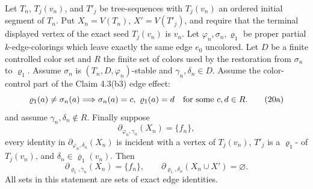 \begin{lemma}
Let \(T_n\), \(T_j(v_n)\), and \(T'_j\) be tree-sequences with
\(T_j(v_n)\) an ordered initial segment of \(T_n\).  Put
\(X_n=V(T_n)\), \(X'=V(T'_j)\), and require that the terminal displayed
vertex of the exact seed \(T_j(v_n)\) is \(v_n\).
Let \(\varphi_n,\sigma_n,\varrho_1\) be proper partial \(k\)-edge-colorings
which leave exactly the same edge \(e_0\) uncolored.  Let \(D\) be a
finite controlled color set and \(R\) the finite set of colors used by
the restoration from \(\sigma_n\) to \(\varrho_1\).  Assume
\(\sigma_n\) is \((T_n,D,\varphi_n)\)-stable and
\(\gamma_n,\delta_n\in D\).  Assume the color-control part of the
Claim 4.3(b3) edge effect:
\[
 \varrho_1(a)\ne\sigma_n(a)
 \Longrightarrow
 \sigma_n(a)=c,\ \varrho_1(a)=d\quad\hbox{for some }c,d\in R.       \tag{20a}
\]
and assume \(\gamma_n,\delta_n\notin R\).  Finally suppose
\[
 \partial_{\varphi_n,\gamma_n}(X_n)=\{f_n\},                     \tag{20b}
\]
every identity in \(\partial_{\varphi_n,\delta_n}(X_n)\) is incident
with a vertex of \(T_j(v_n)\), \(T'_j\) is a
\(\varrho_1\)- of \(T_j(v_n)\), and
\(\delta_n\in\overline{\varrho}_1(v_n)\).  Then
\[
 \partial_{\varrho_1,\gamma_n}(X_n)=\{f_n\},\qquad
 \partial_{\varrho_1,\delta_n}(X_n\cup X')=\varnothing.          \tag{20}
\]
All sets in this statement are sets of exact edge identities.
\end{lemma}
